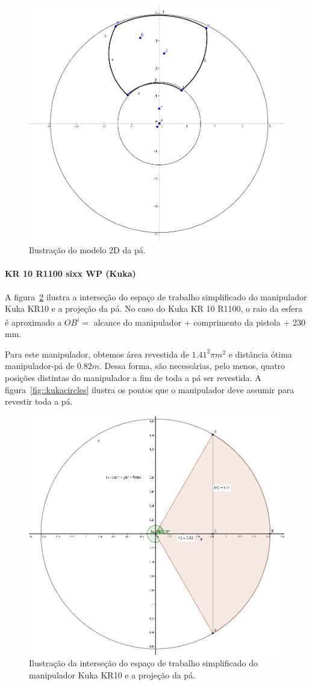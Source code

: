 \begin{figure}[h!]
	\centering	
	\includegraphics[width=0.6\columnwidth]{detail/figs/bighatch/pa2D.png}
	\caption{Ilustração do modelo 2D da pá.}
	\label{fig::pa2D}
\end{figure}

\paragraph{KR 10 R1100 sixx WP (Kuka)}
A figura~\ref{fig::kukageom} ilustra a interseção do espaço de trabalho
simplificado do manipulador Kuka KR10 e a projeção da pá. No
caso do Kuka KR 10 R1100, o raio da esfera é aproximado a $\overline{OB^i} = $
alcance do manipulador + comprimento da pistola + 230 mm. 

Para este manipulador, obtemos área revestida de $1.41^2\pi m^2$ e distância
ótima manipulador-pá de $0.82 m$. Dessa forma, são necessárias, pelo menos,
quatro posições distintas do manipulador a fim de toda a pá ser revestida. A
figura~\ref{fig::kukacircles} ilustra os pontos que o manipulador deve assumir
para revestir toda a pá. 

\begin{figure}[h!]
	\centering	
	\includegraphics[width=0.6\columnwidth]{detail/figs/bighatch/kukageom.jpg}
	\caption{Ilustração da interseção do espaço de trabalho simplificado do
	manipulador Kuka KR10 e a projeção da pá.}
	\label{fig::kukageom}
\end{figure}

